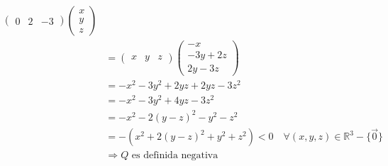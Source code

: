 \documentclass{article}
\newcommand{\R}{\mathbb{R}}
\begin{document}
\begin{enumerate}
\begin{align*}
\begin{pmatrix}
                    0 & 2 & -3
                \end{pmatrix}
                \begin{pmatrix}
                    x\\ y\\ z
                \end{pmatrix}\\
                &=
                \begin{pmatrix}
                    x & y & z
                \end{pmatrix}
                \begin{pmatrix}
                    -x \\ -3y +2z \\ 2y -3z
                \end{pmatrix}\\
                &=-x^2-3y^2+2yz+2yz-3z^2\\
                &=-x^2-3y^2+4yz-3z^2\\
                &=-x^2-2(y-z)^2-y^2-z^2\\
                &=-(x^2+2(y-z)^2+y^2+z^2)<0\quad \forall(x,y,z)\in \R^3-\{\vec{0}\}\\
                &\Rightarrow Q \text{ es definida negativa}
            \end{align*}
    \end{enumerate}
\end{document}
